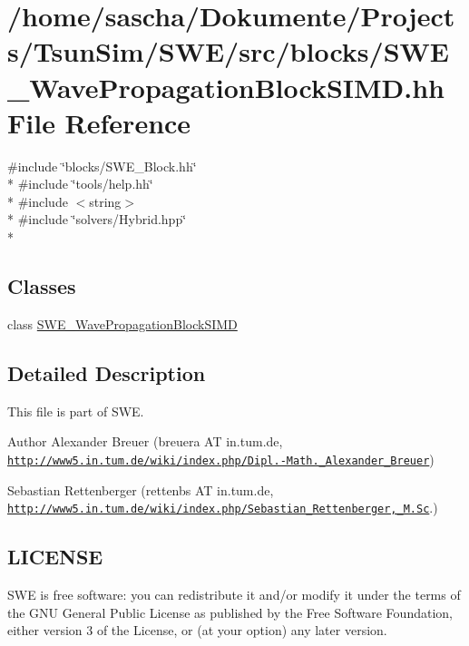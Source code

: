 \hypertarget{SWE__WavePropagationBlockSIMD_8hh}{\section{/home/sascha/\-Dokumente/\-Projects/\-Tsun\-Sim/\-S\-W\-E/src/blocks/\-S\-W\-E\-\_\-\-Wave\-Propagation\-Block\-S\-I\-M\-D.hh File Reference}
\label{SWE__WavePropagationBlockSIMD_8hh}
}
{\ttfamily \#include \char`\"{}blocks/\-S\-W\-E\-\_\-\-Block.\-hh\char`\"{}}\\*
{\ttfamily \#include \char`\"{}tools/help.\-hh\char`\"{}}\\*
{\ttfamily \#include $<$string$>$}\\*
{\ttfamily \#include \char`\"{}solvers/\-Hybrid.\-hpp\char`\"{}}\\*
\subsection*{Classes}
\begin{DoxyCompactItemize}
\item 
class \hyperlink{classSWE__WavePropagationBlockSIMD}{S\-W\-E\-\_\-\-Wave\-Propagation\-Block\-S\-I\-M\-D}
\end{DoxyCompactItemize}


\subsection{Detailed Description}
This file is part of S\-W\-E.

\begin{DoxyAuthor}{Author}
Alexander Breuer (breuera A\-T in.\-tum.\-de, \href{http://www5.in.tum.de/wiki/index.php/Dipl.-Math._Alexander_Breuer}{\tt http\-://www5.\-in.\-tum.\-de/wiki/index.\-php/\-Dipl.-\/\-Math.\-\_\-\-Alexander\-\_\-\-Breuer}) 

Sebastian Rettenberger (rettenbs A\-T in.\-tum.\-de, \href{http://www5.in.tum.de/wiki/index.php/Sebastian_Rettenberger,_M.Sc}{\tt http\-://www5.\-in.\-tum.\-de/wiki/index.\-php/\-Sebastian\-\_\-\-Rettenberger,\-\_\-\-M.\-Sc}.)
\end{DoxyAuthor}
\hypertarget{Writer_8hh_LICENSE}{}\subsection{L\-I\-C\-E\-N\-S\-E}\label{Writer_8hh_LICENSE}
S\-W\-E is free software\-: you can redistribute it and/or modify it under the terms of the G\-N\-U General Public License as published by the Free Software Foundation, either version 3 of the License, or (at your option) any later version.

